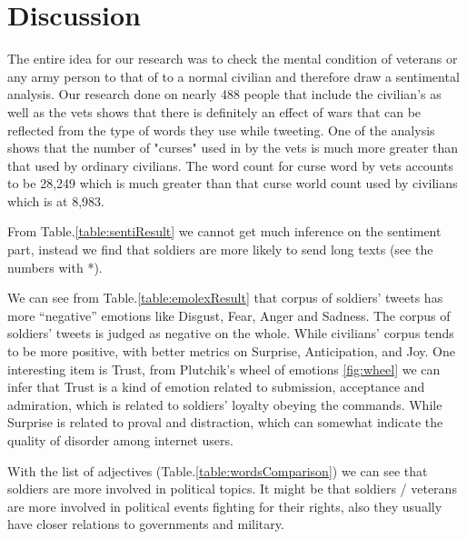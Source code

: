 \section{Discussion}

The entire idea for our research was to check the mental condition of veterans or any army person to that of to a normal civilian and therefore draw a sentimental analysis. Our research done on nearly 488 people that include the civilian’s as well as the vets shows that there is definitely an effect of wars that can be reflected from the type of words they use while tweeting. One of the analysis shows that the number of "curses" used in by the vets is much more greater than that used by ordinary civilians. The word count for curse word by vets accounts to be 28,249 which is much greater than that curse world count used by civilians which is at 8,983.

From Table.\ref{table:sentiResult} we cannot get much inference on the sentiment part, instead we find that soldiers are more likely to send long texts (see the numbers with *).

We can see from Table.\ref{table:emolexResult} that corpus of soldiers' tweets has more \enquote{negative} emotions like Disgust, Fear, Anger and Sadness. The corpus of soldiers' tweets is judged as negative on the whole. While civilians' corpus tends to be more positive, with better metrics on Surprise, Anticipation, and Joy. One interesting item is Trust, from Plutchik’s wheel of emotions \ref{fig:wheel} we can infer that Trust is a kind of emotion related to submission, acceptance and admiration, which is related to soldiers' loyalty obeying the commands. While Surprise is related to proval and distraction, which can somewhat indicate the quality of disorder among internet users.

With the list of adjectives (Table.\ref{table:wordsComparison}) we can see that soldiers are more involved in political topics. It might be that soldiers / veterans are more involved in political events fighting for their rights, also they usually have closer relations to governments and military.
